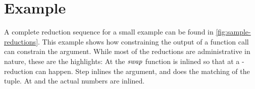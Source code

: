 












\section{Example}
A complete reduction sequence for a small example can be found in \cref{fig:sample-reductions}.
This example shows how constraining the output of a function call can constrain the argument.
While most of the reductions are administrative in nature, these are the highlights:
At  the \ensuremath{\Varid{swap}} function is inlined so that at  a \textbeta-reduction can happen.
Step  inlines the argument, and  does the matching of the tuple.
At  and  the actual numbers are inlined.
